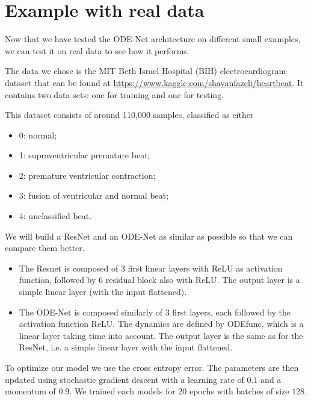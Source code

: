 \documentclass[10pt,a4paper]{article}
\theoremstyle{definition}
\theoremstyle{definition}
\theoremstyle{definition}
\begin{document}
\newpage
\section{Example with real data}

Now that we have tested the ODE-Net architecture on different small examples, we can test it on real data to see how it performs. 

The data we chose is the MIT Beth Israel Hospital (BIH) electrocardiogram dataset that can be found at \url{https://www.kaggle.com/shayanfazeli/heartbeat}. It contains two data sets: one for training and one for testing.

This dataset consists of around 110,000 samples, classified as either 
\begin{itemize}
\item 0: normal;
\item 1: supraventricular premature beat;
\item 2: premature ventricular contraction;
\item 3: fusion of ventricular and normal beat;
\item 4: unclassified beat.
\end{itemize}

We will build a ResNet and an ODE-Net as similar as possible so that we can compare them better.
\begin{itemize}
\item The Resnet is composed of 3 first linear layers with ReLU as activation function, followed by 6 residual block also with ReLU. The output layer is a simple linear layer (with the input flattened).

\item The ODE-Net is composed similarly of 3 first layers, each followed by the activation function ReLU. The dynamics are defined by ODEfunc, which is a linear layer taking time into account. The output layer is the same as for the ResNet, i.e. a simple linear layer with the input flattened.
\end{itemize}


To optimize our model we use the cross entropy error. The parameters are then updated using stochastic gradient descent with a learning rate of $0.1$ and a momentum of $0.9$.
We trained each models for 20 epochs with batches of size $128$.
\end{document}
